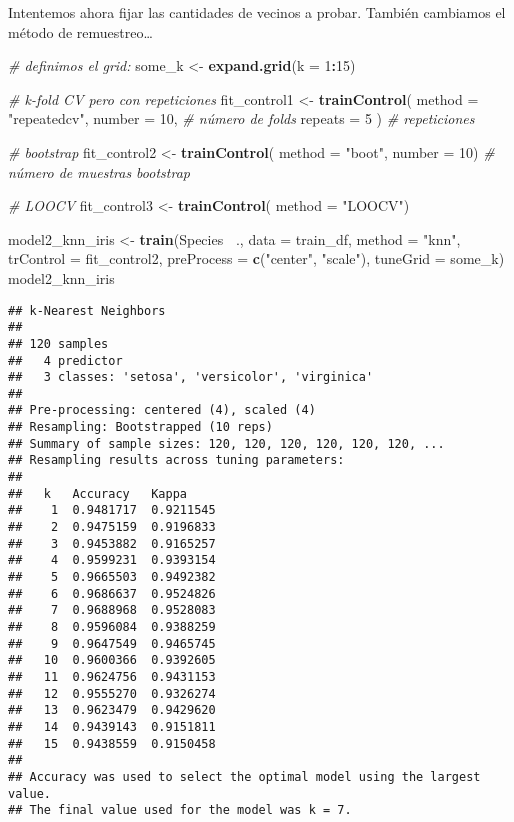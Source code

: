 \documentclass[]{book}
\newenvironment{Shaded}{\begin{snugshade}}{\end{snugshade}}
\newcommand{\CommentTok}[1]{\textcolor[rgb]{0.56,0.35,0.01}{\textit{#1}}}
\newcommand{\DataTypeTok}[1]{\textcolor[rgb]{0.13,0.29,0.53}{#1}}
\newcommand{\DecValTok}[1]{\textcolor[rgb]{0.00,0.00,0.81}{#1}}
\newcommand{\KeywordTok}[1]{\textcolor[rgb]{0.13,0.29,0.53}{\textbf{#1}}}
\newcommand{\NormalTok}[1]{#1}
\newcommand{\OperatorTok}[1]{\textcolor[rgb]{0.81,0.36,0.00}{\textbf{#1}}}
\newcommand{\StringTok}[1]{\textcolor[rgb]{0.31,0.60,0.02}{#1}}
\begin{document}
Intentemos ahora fijar las cantidades de vecinos a probar. También cambiamos el método de remuestreo\ldots{}

\begin{Shaded}
\begin{Highlighting}[]
\CommentTok{# definimos el grid:}
\NormalTok{some_k <-}\StringTok{ }\KeywordTok{expand.grid}\NormalTok{(}\DataTypeTok{k =} \DecValTok{1}\OperatorTok{:}\DecValTok{15}\NormalTok{) }

\CommentTok{# k-fold CV pero con repeticiones}
\NormalTok{fit_control1 <-}\StringTok{ }\KeywordTok{trainControl}\NormalTok{(}
  \DataTypeTok{method =} \StringTok{"repeatedcv"}\NormalTok{, }
  \DataTypeTok{number =} \DecValTok{10}\NormalTok{, }\CommentTok{# número de folds}
  \DataTypeTok{repeats =} \DecValTok{5}\NormalTok{ ) }\CommentTok{# repeticiones}

\CommentTok{# bootstrap}
\NormalTok{fit_control2 <-}\StringTok{ }\KeywordTok{trainControl}\NormalTok{(}
  \DataTypeTok{method =} \StringTok{"boot"}\NormalTok{,  }
  \DataTypeTok{number =} \DecValTok{10}\NormalTok{) }\CommentTok{# número de muestras bootstrap}

\CommentTok{# LOOCV}
\NormalTok{fit_control3 <-}\StringTok{ }\KeywordTok{trainControl}\NormalTok{(}
  \DataTypeTok{method =} \StringTok{"LOOCV"}\NormalTok{) }

\NormalTok{model2_knn_iris <-}\StringTok{ }\KeywordTok{train}\NormalTok{(Species }\OperatorTok{~}\NormalTok{., }
                        \DataTypeTok{data =}\NormalTok{ train_df, }
                        \DataTypeTok{method =} \StringTok{"knn"}\NormalTok{, }
                        \DataTypeTok{trControl =}\NormalTok{ fit_control2, }
                        \DataTypeTok{preProcess =} \KeywordTok{c}\NormalTok{(}\StringTok{"center"}\NormalTok{, }\StringTok{"scale"}\NormalTok{),  }
                        \DataTypeTok{tuneGrid =}\NormalTok{ some_k)}
\NormalTok{model2_knn_iris}
\end{Highlighting}
\end{Shaded}

\begin{verbatim}
## k-Nearest Neighbors 
## 
## 120 samples
##   4 predictor
##   3 classes: 'setosa', 'versicolor', 'virginica' 
## 
## Pre-processing: centered (4), scaled (4) 
## Resampling: Bootstrapped (10 reps) 
## Summary of sample sizes: 120, 120, 120, 120, 120, 120, ... 
## Resampling results across tuning parameters:
## 
##   k   Accuracy   Kappa    
##    1  0.9481717  0.9211545
##    2  0.9475159  0.9196833
##    3  0.9453882  0.9165257
##    4  0.9599231  0.9393154
##    5  0.9665503  0.9492382
##    6  0.9686637  0.9524826
##    7  0.9688968  0.9528083
##    8  0.9596084  0.9388259
##    9  0.9647549  0.9465745
##   10  0.9600366  0.9392605
##   11  0.9624756  0.9431153
##   12  0.9555270  0.9326274
##   13  0.9623479  0.9429620
##   14  0.9439143  0.9151811
##   15  0.9438559  0.9150458
## 
## Accuracy was used to select the optimal model using the largest value.
## The final value used for the model was k = 7.
\end{verbatim}
\end{document}
